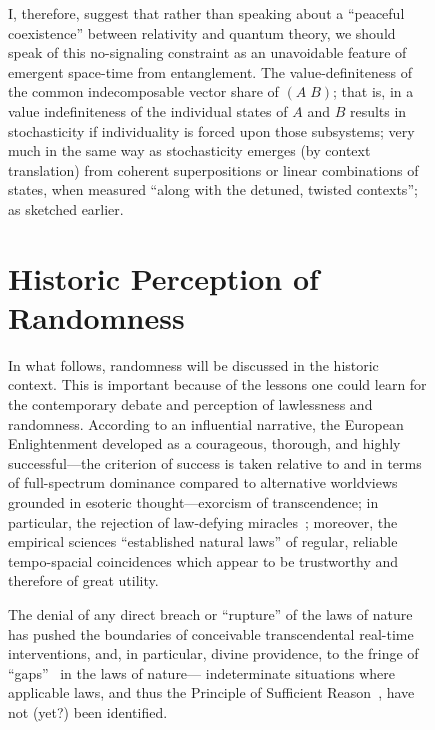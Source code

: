\documentclass[entropy,article,accept,oneauthor,pdftex]{Definitions/mdpi}
\begin{document}
\begin{figure}[H]
I, therefore, suggest that rather than speaking about a ``peaceful coexistence'' between relativity and quantum theory,
we should speak of this no-signaling constraint as an unavoidable feature of emergent space-time from entanglement.
The value-definiteness of the common indecomposable vector share of $(A\;B)$; that is, in a
value indefiniteness of the individual states of $A$ and $B$ results in stochasticity if individuality is forced
upon those subsystems; very much in the same way as stochasticity emerges (by context translation) from
coherent superpositions or linear combinations of states, when measured ``along with the detuned, twisted contexts''; as
sketched earlier.


\section{Historic Perception of Randomness}


In what follows, randomness will be discussed in the historic context.
This is important because of the lessons one could learn for the contemporary debate and perception of lawlessness and randomness.
According to an influential narrative,
the European Enlightenment
developed as a courageous, thorough, and highly successful---the criterion of success
is taken relative to and in terms of full-spectrum dominance compared to alternative worldviews grounded in esoteric thought---exorcism of transcendence;
in particular, the rejection of law-defying  miracles~\cite{Swinburne-Miracle};
moreover, the empirical sciences ``established natural laws'' of regular, reliable tempo-spacial coincidences
which appear to be trustworthy and therefore of great utility.

The denial of any direct breach or ``rupture''
of the laws of nature~\cite[Sect.~III,~10]{frank,franke}
has pushed the boundaries of conceivable transcendental real-time interventions,
and, in particular, divine providence, to the fringe
of ``gaps''~\cite[Sect.~III,~12]{frank,franke} in the laws of nature---
indeterminate situations where applicable laws,
and thus the Principle of Sufficient Reason~\cite{sep-sufficient-reason}, have not (yet?) been identified.


\end{figure}
\end{document}
